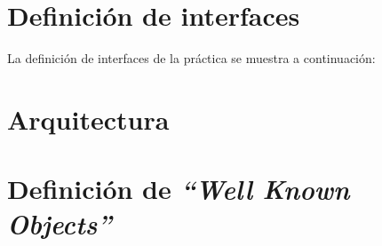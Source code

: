 
\section{Definición de interfaces}

La definición de interfaces de la práctica se muestra a continuación:







\section{Arquitectura}







\section{Definición de \emph{``Well Known Objects''}}





